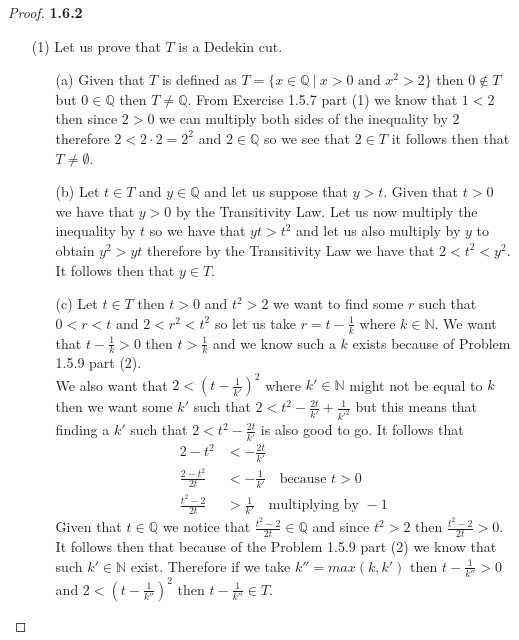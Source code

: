 \documentclass[11pt]{article}
\newcommand{\N}{\mathbb{N}}
\newcommand{\Q}{\mathbb{Q}}
\theoremstyle{definition}
\begin{document}
    \begin{proof}{\textbf{1.6.2}}
    \begin{itemize}
    \item [(1)] Let us prove that $T$ is a Dedekin cut.
    \begin{itemize}
        \item [(a)] Given that $T$ is defined as $T =\{x \in \Q~|~x>0 \text{ and }x^2>2\}$
        then $0 \notin T$ but $0 \in \Q$ then $T \neq \Q$. From Exercise 1.5.7 part (1)
        we know that $1<2$ then since $2>0$ we can multiply both sides of the inequality
        by $2$ therefore $2<2\cdot 2 = 2^2$ and $2 \in \Q$ so we see that $2 \in T$ it
        follows then that $T \neq \emptyset$.
        \item [(b)] Let $t \in T$ and $y \in \Q$ and let us suppose that $y > t$. Given
        that $t>0$ we have that $y>0$ by the Transitivity Law. Let us now multiply the
        inequality by $t$ so we have that $yt>t^2$ and let us also multiply by $y$ to
        obtain $y^2>yt$ therefore by the Transitivity Law we have that $2<t^2<y^2$. It
        follows then that $y \in T$.
        \item [(c)] Let $t \in T$ then $t>0$ and $t^2>2$ we want to find some $r$ such
        that $0<r<t$ and $2<r^2<t^2$ so let us take $r = t - \frac{1}{k}$ where
        $k \in \N$. We want that $t-\frac{1}{k}>0$ then $t > \frac{1}{k}$ and we know
        such a $k$ exists because of Problem 1.5.9 part (2).\\
        We also want that $2<(t-\frac{1}{k'})^2$ where $k' \in \N$ might not be equal to
        $k$ then we want some $k'$ such that  $2 < t^2 - \frac{2t}{k'} +\frac{1}{k'^2}$
        but this means that finding a $k'$ such that $2 < t^2 - \frac{2t}{k'}$ is also
        good to go. It follows that 
        \begin{align*}
            2 - t^2 &< -\frac{2t}{k'} \\  
            \frac{2 - t^2}{2t} &< -\frac{1}{k'} \quad \text{because }t >0\\
            \frac{t^2 - 2}{2t} &> \frac{1}{k'} \quad \text{multiplying by }-1
        \end{align*}
        Given that $t \in \Q$ we notice that $\frac{t^2- 2}{2t} \in \Q$ and since
        $t^2>2$ then $\frac{t^2- 2}{2t} > 0$. It follows then that because of the
        Problem 1.5.9 part (2) we know that such $k' \in \N$ exist.
        Therefore if we take $k'' = max(k, k')$ then $t - \frac{1}{k''} >0$ and
        $2<(t -\frac{1}{k''})^2$ then $t -\frac{1}{k''} \in T$.

\end{itemize}
\end{itemize}
\end{proof}
\end{document}

